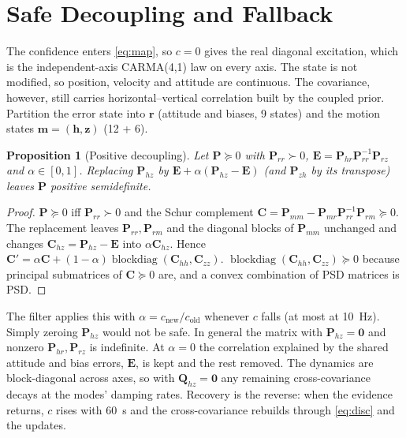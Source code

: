 \documentclass[conference]{IEEEtran}
\DeclareRobustCommand{\vct}[1]{\bm{#1}}
\DeclareRobustCommand{\mat}[1]{\bm{#1}}
\theoremstyle{bodysmall}
\newtheorem{proposition}{Proposition}
\begin{document}
\section{Safe Decoupling and Fallback}
\label{sec:fallback}
The confidence enters \eqref{eq:map}, so $c=0$ gives the real diagonal
excitation, which is the independent-axis CARMA(4,1) law on every axis. The
state is not modified, so position, velocity and attitude are continuous.
The covariance, however, still carries horizontal--vertical correlation built
by the coupled prior. Partition the error state into $\vct r$ (attitude and
biases, 9 states) and the motion states $\vct m=(\vct h,\vct z)$ (12 + 6).
\begin{proposition}[Positive decoupling]
\label{prop:shrink}
Let $\mat P\succeq0$ with $\mat P_{rr}\succ0$,
$\mat E=\mat P_{hr}\mat P_{rr}^{-1}\mat P_{rz}$ and $\alpha\in[0,1]$. Replacing
$\mat P_{hz}$ by $\mat E+\alpha(\mat P_{hz}-\mat E)$ (and $\mat P_{zh}$ by its
transpose) leaves $\mat P$ positive semidefinite.
\end{proposition}
\begin{proof}
$\mat P\succeq0$ iff $\mat P_{rr}\succ0$ and the Schur complement
$\mat C=\mat P_{mm}-\mat P_{mr}\mat P_{rr}^{-1}\mat P_{rm}\succeq0$. The
replacement leaves $\mat P_{rr},\mat P_{rm}$ and the diagonal blocks of
$\mat P_{mm}$ unchanged and changes $\mat C_{hz}=\mat P_{hz}-\mat E$ into
$\alpha\mat C_{hz}$. Hence $\mat C'=\alpha\mat C+(1-\alpha)\operatorname{blockdiag}(\mat C_{hh},\mat C_{zz})$.
$\operatorname{blockdiag}(\mat C_{hh},\mat C_{zz})\succeq0$ because principal
submatrices of $\mat C\succeq0$ are, and a convex combination of PSD matrices
is PSD.
\end{proof}
The filter applies this with $\alpha=c_{\mathrm{new}}/c_{\mathrm{old}}$
whenever $c$ falls (at most at \SI{10}{Hz}). Simply zeroing $\mat P_{hz}$
would not be safe. In general the matrix with $\mat P_{hz}=\mat 0$ and
nonzero $\mat P_{hr},\mat P_{rz}$ is indefinite. At $\alpha=0$ the
correlation explained by the shared attitude and bias errors, $\mat E$, is
kept and the rest removed. The dynamics are block-diagonal across axes, so
with $\mat Q_{hz}=\mat 0$ any remaining cross-covariance decays at the modes'
damping rates. Recovery is the reverse: when the evidence returns, $c$
rises with \SI{60}{s} and the cross-covariance rebuilds through
\eqref{eq:disc} and the updates.
\end{document}
